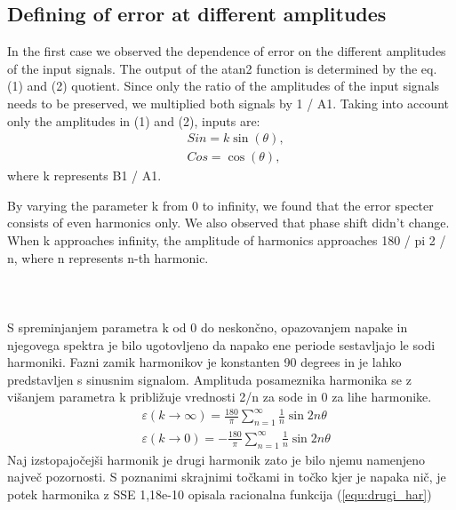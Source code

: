 \documentclass[a4paper]{article}
\begin{document}
\subsection{Defining of error at different amplitudes}
In the first case we observed the dependence of error on the different amplitudes of the input signals. The output of the atan2 function is determined by the eq. (1)  and (2) quotient. Since only the ratio of the amplitudes of the input signals needs to be preserved, we multiplied both signals by 1 / A1. Taking into account only the amplitudes in (1) and (2), inputs are:
	\begin{eqnarray}
	\label{equ:def_sin_ama}
	&Sin = k \sin(\theta),\\
	\label{equ:def_cos_amp}
	&Cos =\cos(\theta),
	\end{eqnarray}
where k represents B1 / A1.

By varying the parameter k from 0 to infinity, we found that the error specter consists of even harmonics only. We also observed that phase shift didn't change. When k approaches infinity, the amplitude of harmonics approaches 180 / pi 2 / n, where n represents n-th harmonic.
\\ \\ \\ \\
S spreminjanjem parametra k od 0 do neskončno, opazovanjem napake in njegovega spektra je bilo ugotovljeno da napako ene periode sestavljajo le sodi harmoniki. Fazni zamik harmonikov je konstanten 90 degrees in je lahko predstavljen s sinusnim signalom. Amplituda posameznika harmonika se z višanjem parametra k približuje vrednosti 2/n za sode in 0 za lihe harmonike. 
\begin{eqnarray}
\label{equ:lim_amp_vrsta}
&\varepsilon(k \rightarrow \infty) = \frac{180}{\pi}\sum_{n=1}^{\infty}\frac{1}{n} \sin 2 n \theta\\
&\varepsilon(k \rightarrow 0) = -\frac{180}{\pi}\sum_{n=1}^{\infty}\frac{1}{n} \sin 2 n \theta
\end{eqnarray}
Naj izstopajočejši harmonik je drugi harmonik zato je bilo njemu namenjeno največ pozornosti.
S poznanimi skrajnimi točkami in točko kjer je napaka nič, je potek harmonika z SSE 1,18e-10 opisala racionalna funkcija (\ref{equ:drugi_har})
\end{document}
